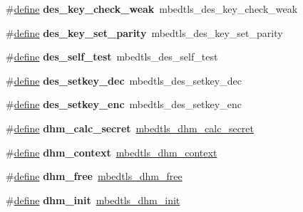 \begin{DoxyCompactItemize}
\#\hyperlink{structdefine}{define} {\bfseries des\+\_\+key\+\_\+check\+\_\+weak}~mbedtls\+\_\+des\+\_\+key\+\_\+check\+\_\+weak
\item 
\mbox{\label{compat-1_83_8h_a32ef5dedbc6d31474d550c2229b54953}} 
\#\hyperlink{structdefine}{define} {\bfseries des\+\_\+key\+\_\+set\+\_\+parity}~mbedtls\+\_\+des\+\_\+key\+\_\+set\+\_\+parity
\item 
\mbox{\label{compat-1_83_8h_a14ad01ffabf42d22c89bc80db0dde496}} 
\#\hyperlink{structdefine}{define} {\bfseries des\+\_\+self\+\_\+test}~mbedtls\+\_\+des\+\_\+self\+\_\+test
\item 
\mbox{\label{compat-1_83_8h_a4ed9162947f2c144b49e76a4e67116d9}} 
\#\hyperlink{structdefine}{define} {\bfseries des\+\_\+setkey\+\_\+dec}~mbedtls\+\_\+des\+\_\+setkey\+\_\+dec
\item 
\mbox{\label{compat-1_83_8h_ac1391279226778f0fcf83ecb958257d3}} 
\#\hyperlink{structdefine}{define} {\bfseries des\+\_\+setkey\+\_\+enc}~mbedtls\+\_\+des\+\_\+setkey\+\_\+enc
\item 
\mbox{\label{compat-1_83_8h_a6b426313d39c27208bd82990aad4d8bf}} 
\#\hyperlink{structdefine}{define} {\bfseries dhm\+\_\+calc\+\_\+secret}~\hyperlink{dhm_8h_ac3985de01420d018ed91daec9e7d7969}{mbedtls\+\_\+dhm\+\_\+calc\+\_\+secret}
\item 
\mbox{\label{compat-1_83_8h_affdd62bb207fc5f12c72e8bef0c11d27}} 
\#\hyperlink{structdefine}{define} {\bfseries dhm\+\_\+context}~\hyperlink{structmbedtls__dhm__context}{mbedtls\+\_\+dhm\+\_\+context}
\item 
\mbox{\label{compat-1_83_8h_adaf6ae910380f236504ef1f1899bceb4}} 
\#\hyperlink{structdefine}{define} {\bfseries dhm\+\_\+free}~\hyperlink{dhm_8h_a092d039d88063538f67aaf9cf45d1d30}{mbedtls\+\_\+dhm\+\_\+free}
\item 
\mbox{\label{compat-1_83_8h_af1b79f9d221f0c1ce4f94b149e265c22}} 
\#\hyperlink{structdefine}{define} {\bfseries dhm\+\_\+init}~\hyperlink{dhm_8h_abf5ead59678b6ca8892b3c052452f5ac}{mbedtls\+\_\+dhm\+\_\+init}
\item 

\end{DoxyCompactItemize}
